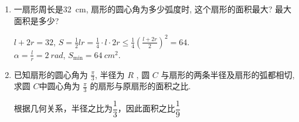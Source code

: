 \begin{enumerate}
\begin{jieda}
该图的信息有点多: 

\begin{itemize}
\item 由$\alpha$所在的象限, 可得$\dfrac{\alpha}{2}$所在象限, 且只能是象限中的一部分. 
\item 由$\alpha$所在的象限, 可得$2\alpha$所在象限. 
\item 可推广到$\dfrac{\alpha}{n}\left(n\zn\right)$的情形. 
\end{itemize}

\begin{enumerate}[(1)]
\item $2^x>0, \log_{\frac{1}{2}}2=-1$, 故$\alpha$是第四象限角, 于是$\dfrac{\alpha}{2}$是第II,IV象限角. 

\item 每个象限等分为3份, 然后逆时针依次标上1234(周期). 

\end{enumerate}

\end{jieda}



\item 一扇形周长是\SI{32}{cm}, 扇形的圆心角为多少弧度时, 这个扇形的面积最大? 最大面积是多少? 
\begin{jieda}
$l+2r=32$, $S=\frac{1}{2}lr=\frac{1}{4}\cdot l\cdot2r\leq\frac{1}{4}\left(\frac{l+2r}{2}\right)^2=64$. \\
$\alpha=\frac{l}{r}=\SI{2}{rad}$, $S_{\min}=\SI{64}{cm^2}$. 
\end{jieda}


\item 已知扇形的圆心角为 $\frac{\pi}{3}$, 半径为 $R$ , 圆 $C$ 与扇形的两条半径及扇形的弧都相切, 求圆 $C $中圆心角为 $\frac{\pi}{3}$ 的扇形与原扇形的面积之比.
\begin{jieda}
    根据几何关系，半径之比为$\dfrac{1}{3}$，因此面积之比$\dfrac{1}{9}$
\end{jieda}

\end{enumerate}

